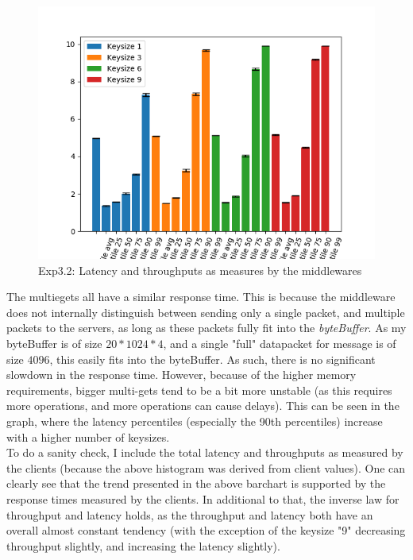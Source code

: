 \documentclass[11pt,a4paper]{article}
\begin{document}
\begin{figure}[H]
\centering
\includegraphics[width=\textwidth]{img/exp5_1/exp5_1_client_percentile_plots_sharded_True.png}
\caption{Exp3.2: Latency and throughputs as measures by the middlewares}
\label{fig:test}
\end{figure}

The multiegets all have a similar response time.
This is because the middleware does not internally distinguish between sending only a single packet, and multiple packets to the servers, as long as these packets fully fit into the \textit{byteBuffer}.
As my byteBuffer is of size $20 * 1024 * 4$, and a single "full" datapacket for message is of size $ 4096 $, this easily fits into the byteBuffer.
As such, there is no significant slowdown in the response time.
However, because of the higher memory requirements, bigger multi-gets tend to be a bit more unstable (as this requires more operations, and more operations can cause delays).
This can be seen in the graph, where the latency percentiles (especially the 90th percentiles) increase with a higher number of keysizes. \\

To do a sanity check, I include the total latency and throughputs as measured by the clients (because the above histogram was derived from client values).
One can clearly see that the trend presented in the above barchart is supported by the response times measured by the clients.
In additional to that, the inverse law for throughput and latency holds, as the throughput and latency both have an overall almost constant tendency (with the exception of the keysize "9" decreasing throughput slightly, and increasing the latency slightly).
\end{document}
